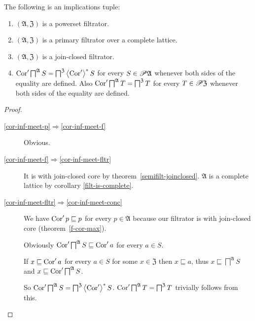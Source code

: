 \begin{thm}
\label{dual-cor-inf-meet}The following is an implications tuple:
\begin{enumerate}
\item \label{cor-inf-meet-p}$(\mathfrak{A},\mathfrak{Z})$ is a powerset
filtrator.
\item \label{cor-inf-meet-f}$(\mathfrak{A},\mathfrak{Z})$ is a primary filtrator
over a complete lattice.
\item \label{cor-inf-meet-fltr}$(\mathfrak{A},\mathfrak{Z})$ is a join-closed
filtrator.
\item \label{cor-inf-meet-conc}$\operatorname{Cor}'\bigsqcap^{\mathfrak{A}}S=\bigsqcap^{\mathfrak{Z}}\left\langle \operatorname{Cor}'\right\rangle ^{\ast}S$
for every $S\in\mathscr{P}\mathfrak{A}$
whenever both sides of the equality are defined.
Also $\operatorname{Cor}'\bigsqcap^{\mathfrak{A}}T=\bigsqcap^{\mathfrak{Z}}T$
for every $T\in\mathscr{P}\mathfrak{Z}$
whenever both sides of the equality are defined.
\end{enumerate}
\end{thm}
\begin{proof}
~
\begin{description}
\item [{\ref{cor-inf-meet-p}$\Rightarrow$\ref{cor-inf-meet-f}}] Obvious.
\item [{\ref{cor-inf-meet-f}$\Rightarrow$\ref{cor-inf-meet-fltr}}] It
is with join-closed core by theorem~\ref{semifilt-joinclosed}.
$\mathfrak{A}$ is a complete lattice by corollary \ref{filt-is-complete}.
\item [{\ref{cor-inf-meet-fltr}$\Rightarrow$\ref{cor-inf-meet-conc}}] We have $\operatorname{Cor}'p\sqsubseteq p$ for every $p\in\mathfrak{A}$ because
our filtrator is with join-closed core (theorem~\ref{f-cor-max}).


Obviously $\operatorname{Cor}'\bigsqcap^{\mathfrak{A}}S\sqsubseteq\operatorname{Cor}'a$ for every
$a\in S$.


If $x\sqsubseteq\operatorname{Cor}'a$ for every $a\in S$ for some $x\in\mathfrak{Z}$
then $x\sqsubseteq a$, thus $x\sqsubseteq\bigsqcap^{\mathfrak{A}}S$
and $x\sqsubseteq\operatorname{Cor}'\bigsqcap^{\mathfrak{A}}S$.


So $\operatorname{Cor}'\bigsqcap^{\mathfrak{A}}S=\bigsqcap^{\mathfrak{Z}}\left\langle \operatorname{Cor}'\right\rangle ^{\ast}S$.
$\operatorname{Cor}'\bigsqcap^{\mathfrak{A}}T=\bigsqcap^{\mathfrak{Z}}T$ trivially
follows from this.

\end{description}
\end{proof}
